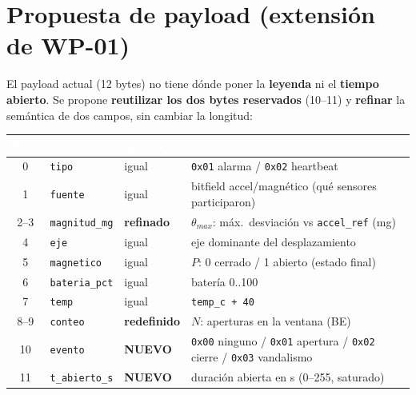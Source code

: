 \documentclass[11pt,a4paper]{article}
\begin{document}
\section{Propuesta de payload (extensión de WP-01)}
\label{sec:payload}

El payload actual (12 bytes) no tiene dónde poner la \textbf{leyenda} ni el
\textbf{tiempo abierto}. Se propone \textbf{reutilizar los dos bytes reservados}
(10--11) y \textbf{refinar} la semántica de dos campos, sin cambiar la longitud:

\begin{center}
\renewcommand{\arraystretch}{1.3}
\begin{tabularx}{\linewidth}{@{}c l l X@{}}
\toprule
\rowcolor{Indigo0G}
\textcolor{white}{\textbf{Byte}} & \textcolor{white}{\textbf{Campo}} &
\textcolor{white}{\textbf{Estado}} & \textcolor{white}{\textbf{Definición propuesta}} \\
\midrule
0     & \texttt{tipo}        & igual & \texttt{0x01} alarma / \texttt{0x02} heartbeat \\
\rowcolor{Light0G}
1     & \texttt{fuente}      & igual & bitfield accel/magnético (qué sensores participaron) \\
2--3  & \texttt{magnitud\_mg}& \textcolor{Purple0G}{\textbf{refinado}} & $\theta_{max}$: máx.\ desviación vs \texttt{accel\_ref} (mg) \\
\rowcolor{Light0G}
4     & \texttt{eje}         & igual & eje dominante del desplazamiento \\
5     & \texttt{magnetico}   & igual & $P$: 0 cerrado / 1 abierto (estado final) \\
\rowcolor{Light0G}
6     & \texttt{bateria\_pct}& igual & batería 0..100 \\
7     & \texttt{temp}        & igual & \texttt{temp\_c + 40} \\
\rowcolor{Light0G}
8--9  & \texttt{conteo}      & \textcolor{Purple0G}{\textbf{redefinido}} & $N$: aperturas en la ventana (BE) \\
10    & \texttt{evento}      & \textcolor{Green0G}{\textbf{NUEVO}} & \texttt{0x00} ninguno / \texttt{0x01} apertura / \texttt{0x02} cierre / \texttt{0x03} vandalismo \\
\rowcolor{Light0G}
11    & \texttt{t\_abierto\_s} & \textcolor{Green0G}{\textbf{NUEVO}} & duración abierta en s (0--255, saturado) \\
\bottomrule
\end{tabularx}
\end{center}
\end{document}
